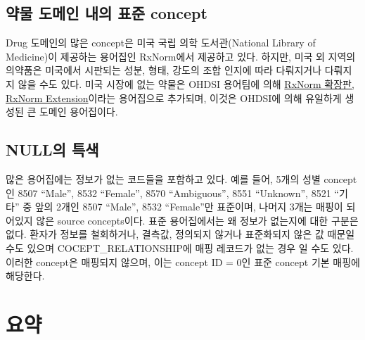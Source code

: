 \documentclass[11pt]{book}
\theoremstyle{definition}
\theoremstyle{definition}
\theoremstyle{definition}
\theoremstyle{remark}
\begin{document}
\subsection{약물 도메인 내의 표준 concept}\label{rxNormExtension}

Drug 도메인의 많은 concept은 미국 국립 의학 도서관(National Library of
Medicine)이 제공하는 용어집인 RxNorm에서 제공하고 있다. 하지만, 미국 외
지역의 의약품은 미국에서 시판되는 성분, 형태, 강도의 조합 인지에 따라
다뤄지거나 다뤄지지 않을 수도 있다. 미국 시장에 없는 약물은 OHDSI
용어팀에 의해
\href{https://www.ohdsi.org/web/wiki/doku.php?id=documentation:vocabulary:rxnorm_extension}{RxNorm
확장판, RxNorm Extension}이라는 용어집으로 추가되며, 이것은 OHDSI에 의해
유일하게 생성된 큰 도메인 용어집이다.

\subsection{NULL의 특색}\label{null-}

많은 용어집에는 정보가 없는 코드들을 포함하고 있다. 예를 들어, 5개의
성별 concept인 8507 ``Male'', 8532 ``Female'', 8570 ``Ambiguous'', 8551
``Unknown'', 8521 ``기타'' 중 앞의 2개인 8507 ``Male'', 8532
``Female''만 표준이며, 나머지 3개는 매핑이 되어있지 않은 source
concepts이다. 표준 용어집에서는 왜 정보가 없는지에 대한 구분은 없다.
환자가 정보를 철회하거나, 결측값, 정의되지 않거나 표준화되지 않은 값
때문일 수도 있으며 COCEPT\_RELATIONSHIP에 매핑 레코드가 없는 경우 일
수도 있다. 이러한 concept은 매핑되지 않으며, 이는 concept ID = 0인 표준
concept 기본 매핑에 해당한다.

\section{요약}\label{-3}
\end{document}
